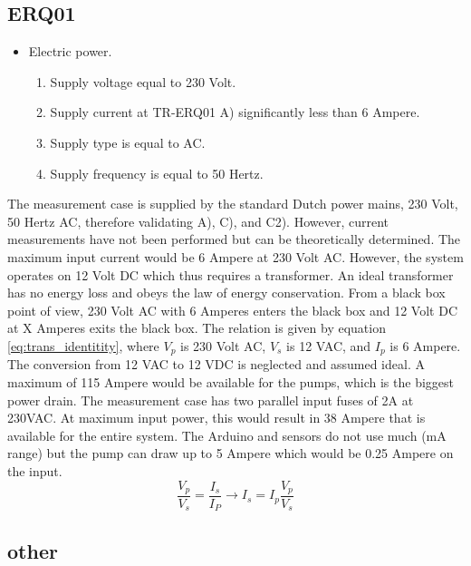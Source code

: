 \subsection*{ERQ01}
\begin{itemize}
	\item Electric power.
	\begin{enumerate}[label=\Alph*, noitemsep]
		\item Supply voltage equal to 230 Volt.
		\item Supply current at TR-ERQ01 A) significantly less than 6 Ampere.
		\item Supply type is equal to AC.
		\item Supply frequency is equal to 50 Hertz.
	\end{enumerate}
\end{itemize}
The measurement case is supplied by the standard Dutch power mains, 230 Volt, 50 Hertz AC, therefore validating A), C), and C2). However, current measurements have not been performed but can be theoretically determined. The maximum input current would be 6 Ampere at 230 Volt AC. However, the system operates on 12 Volt DC which thus requires a transformer. An ideal transformer has no energy loss and obeys the law of energy conservation. From a black box point of view, 230 Volt AC with 6 Amperes enters the black box and 12 Volt DC at X Amperes exits the black box. The relation is given by equation \ref{eq:trans_identitity}, where $V_p$ is 230 Volt AC, $V_s$ is 12 VAC, and $I_p$ is 6 Ampere. The conversion from 12 VAC to 12 VDC is neglected and assumed ideal. A maximum of 115 Ampere would be available for the pumps, which is the biggest power drain. The measurement case has two parallel input fuses of 2A at 230VAC. At maximum input power, this would result in 38 Ampere that is available for the entire system. The Arduino and sensors do not use much (mA range) but the pump can draw up to 5 Ampere which would be 0.25 Ampere on the input. 
\begin{equation}
\label{eq:trans_identitity}
	\frac{V_p}{V_s} = \frac{I_s}{I_P} \rightarrow I_s = I_p\frac{V_p}{V_s}
\end{equation}
\subsection{other}
